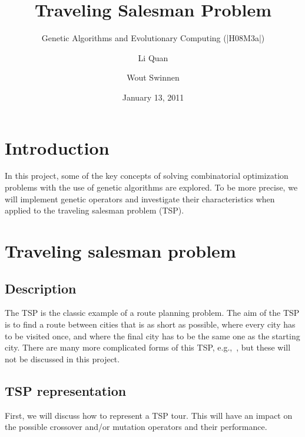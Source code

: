 ﻿\documentclass[a4paper,english,11pt,]{scrartcl}
\title{Traveling Salesman Problem}
\subtitle{Genetic Algorithms and Evolutionary Computing (|H08M3a|)}
\author{Li Quan\and Wout Swinnen}
\date{January 13, 2011}
\begin{document}
\maketitle


\small{
\tableofcontents
\listoffigures
\listoftables
}


\clearpage

\section{Introduction}
In this project, some of the key concepts of solving combinatorial optimization problems with the use of genetic algorithms are explored. To be more precise, we will implement genetic operators and investigate their characteristics when applied to the traveling salesman problem (TSP). 


\section{Traveling salesman problem}
\subsection{Description}
The TSP is the classic example of a route planning problem. The aim of the TSP is to find a route between cities that is as short as possible, where every city has to be visited once, and where the final city has to be the same one as the starting city. There are many more complicated forms of this TSP, e.g.,~\cite{affenzeller2009genetic,multiple_tsp,gutin2002traveling}, but these will not be discussed in this project.
% 

\subsection{TSP representation}
First, we will discuss how to represent a TSP tour. This will have an impact on the possible crossover and/or mutation operators and their performance.
\end{document}
